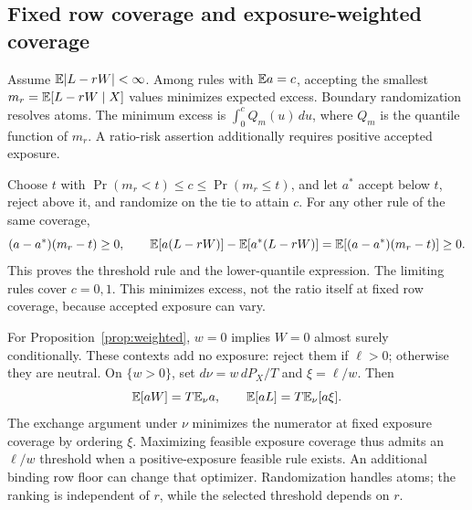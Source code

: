 \subsection{Fixed row coverage and exposure-weighted coverage}
\begingroup
\renewcommand{\theproposition}{1}
\begin{proposition}
\label{prop:threshold}
Assume $\mathbb{E}|L-rW|<\infty$. Among rules with $\mathbb{E} a=c$, accepting
the smallest $m_r=\mathbb{E}[L-rW\mid X]$ values minimizes expected excess.
Boundary randomization resolves atoms. The minimum excess is
$\int_0^cQ_m(u)\,du$, where $Q_m$ is the quantile function of $m_r$.
A ratio-risk assertion additionally requires positive accepted exposure.
\end{proposition}
\endgroup
\addtocounter{proposition}{-1}
Choose $t$ with $\Pr(m_r<t)\leq c\leq\Pr(m_r\leq t)$, and let
$a^*$ accept below $t$, reject above it, and randomize on the tie
to attain $c$. For any other rule of the same coverage,
\[
 (a-a^*)(m_r-t)\geq0,\qquad
 \mathbb{E}[a(L-rW)]-\mathbb{E}[a^*(L-rW)]
 =\mathbb{E}[(a-a^*)(m_r-t)]\geq0.
\]
This proves the threshold rule and the lower-quantile expression.
The limiting rules cover $c=0,1$. This minimizes excess, not the
ratio itself at fixed row coverage, because accepted exposure can vary.

For Proposition~\ref{prop:weighted}, $w=0$ implies $W=0$ almost
surely conditionally. These contexts add no exposure: reject them
if $\ell>0$; otherwise they are neutral. On $\{w>0\}$, set
$d\nu=w\,dP_X/T$ and $\xi=\ell/w$. Then
\[
 \mathbb{E}[aW]=T\mathbb{E}_\nu a,\qquad \mathbb{E}[aL]=T\mathbb{E}_\nu[a\xi].
\]
The exchange argument under $\nu$ minimizes the numerator at fixed
exposure coverage by ordering $\xi$. Maximizing feasible exposure
coverage thus admits an $\ell/w$ threshold when a positive-exposure
feasible rule exists. An additional binding row floor can change
that optimizer. Randomization handles atoms; the ranking is
independent of $r$, while the selected threshold depends on $r$.
